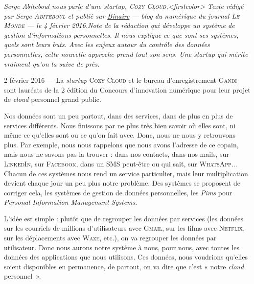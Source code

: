 \begingroup\itshape
Serge Abiteboul nous parle d’une \textup{startup}, \textsc{Cozy Cloud},\caution[t]<firstcolor>{%
\upshape Texte rédigé par Serge \textsc{Abiteboul} et publié sur \href{https://www.lemonde.fr/blog/binaire/2016/02/04/cozy-cloud-vertueux-par-necessite/}{Binaire} --- blog du numérique du journal \textsc{Le Monde} --- le 4 février 2016.}{\upshape Note de la rédaction}
 qui développe un système de gestion d’informations personnelles. Il nous explique ce que sont ses systèmes, quels sont leurs buts. Avec les enjeux autour du contrôle des données personnelles, cette nouvelle approche prend tout son sens. Une \textup{startup} qui mérite vraiment qu’on la suive de près.
\endgroup

\begin{tcolorbox}[boxrule=0pt, arc=0pt, boxsep=0pt, top=4pt, bottom=4pt, left=4pt, right=4pt]
2 février 2016 --- La \textit{startup} \textsc{Cozy Cloud} et le bureau d’enregistrement \textsc{Gandi} sont lauréats de la 2 édition du Concours d’innovation numérique pour leur projet de \textit{cloud} personnel grand public.
\end{tcolorbox}

Nos données sont un peu partout, dans des services, dans de plus en plus de services différents. Nous finissons par ne plus très bien savoir où elles sont, ni même ce qu’elles sont ou ce qu’on fait avec. Donc, nous ne nous y retrouvons plus. Par exemple, nous nous rappelons que nous avons l’adresse de ce copain, mais nous ne savons pas la trouver : dans nos contacts, dans nos mails, sur \textsc{LinkedIn}, sur \textsc{Facebook}, dans un SMS peut-être ou qui sait, sur \textsc{WhatsApp}... Chacun de ces systèmes nous rend un service particulier, mais leur multiplication devient chaque jour un peu plus notre problème. Des systèmes se proposent de corriger cela, les systèmes de gestion de données personnelles, les \emph{Pims} pour \textit{Personal Information Management Systems}.

%
L’idée est simple : plutôt que de regrouper les données par services (les données sur les courriels de millions d’utilisateurs avec \textsc{Gmail}, sur les films avec \textsc{Netflix}, sur les déplacements avec \textsc{Waze}, etc.), on va regrouper les données par utilisateur. Donc nous aurons notre système à nous, pour nous, avec toutes les données des applications que nous utilisons. Ces données, nous voudrions qu’elles soient disponibles en permanence, de partout, on va dire que c’est « notre \textit{cloud} personnel~».

